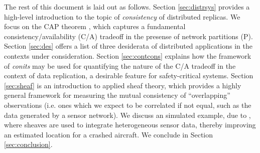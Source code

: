 The rest of this document is laid out as follows. Section
\ref{sec:distrsys} provides a high-level introduction to the topic of
\emph{consistency} of distributed replicas. We focus on the CAP
theorem \cite{2000brewerCAP} \cite{2002gilbertlynchCAP}, which
captures a fundamental consistency/availability (C/A) tradeoff in the
presense of network partitions (P). Section \ref{sec:des} offers a
list of three desiderata of distributed applications in the contexts
under consideration.  Section \ref{sec:contcons} explains how the
framework of \emph{conits} \cite{2002tact} may be used for quantifying
the nature of the C/A tradeoff in the context of data replication, a
desirable feature for safety-critical systems. Section \ref{sec:sheaf}
is an introduction to applied sheaf theory, which provides a highly
general framework for measuring the mutual consistency of
``overlapping'' observations (i.e. ones which we expect to be
correlated if not equal, such as the data generated by a sensor
network). We discuss an simulated example, due to \cite{}, where
sheaves are used to integrate heterogeneous sensor data, thereby
improving an estimated location for a crashed aircraft. We conclude in
Section \ref{sec:conclusion}.
